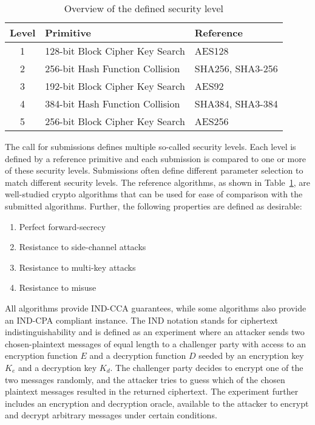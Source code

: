 \begin{table}[ht]
    \centering
    \caption{Overview of the defined security level}
        \begin{tabular}{cll}
        \hline
         \textbf{Level} & \textbf{Primitive} & \textbf{Reference} \\
         \hline
         1 &  128-bit Block Cipher Key Search & AES128 \\
         2 &  256-bit Hash Function Collision & SHA256, SHA3-256 \\
         3 &  192-bit Block Cipher Key Search & AES92 \\
         4 &  384-bit Hash Function Collision & SHA384, SHA3-384 \\
         5 &  256-bit Block Cipher Key Search & AES256 \\
        \end{tabular}
        \label{table:nist_security_level}
    \end{table}


The call for submissions defines multiple so-called security levels. Each level is defined by a reference primitive and each submission is compared to one or more of these security levels. Submissions often define different parameter selection to match different security levels. The reference algorithms, as shown in Table~\ref{table:nist_security_level}, are well-studied crypto algorithms that can be used for ease of comparison with the submitted algorithms. Further, the following properties are defined as desirable:

\begin{enumerate}
    \setlength{\itemsep}{0pt}
    \item Perfect forward-secrecy
    \item Resistance to side-channel attacks
    \item Resistance to multi-key attacks
    \item Resistance to misuse
\end{enumerate}

All algorithms provide IND-CCA guarantees, while some algorithms also provide an IND-CPA compliant instance. The IND notation stands for ciphertext indistinguishability and is defined as an experiment where an attacker sends two chosen-plaintext messages of equal length to a challenger party with access to an encryption function \(E\) and a decryption function \(D\) seeded by an encryption key \(K_e\) and a decryption key \(K_d\). The challenger party decides to encrypt one of the two messages randomly, and the attacker tries to guess which of the chosen plaintext messages resulted in the returned ciphertext. The experiment further includes an encryption and decryption oracle, available to the attacker to encrypt and decrypt arbitrary messages under certain conditions.

